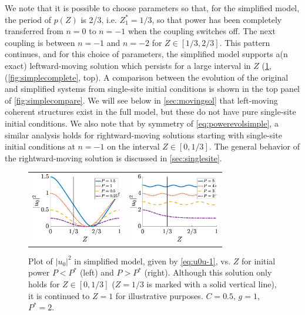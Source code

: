 \documentclass[reprint, amsmath,amssymb,aps,pre]{revtex4-2}
\begin{document}
We note that it is possible to choose parameters so that, for the simplified model, the period of $p(Z)$ is 2/3, i.e. $Z_1^* = 1/3$, so that power has been completely transferred from $n=0$ to $n=-1$ when the coupling switches off. The next coupling is between $n=-1$ and $n=-2$ for $Z \in [1/3,2/3]$. This pattern continues, and for this choice of parameters, the simplified model supports 
a(n exact) leftward-moving solution which persists for a large interval in $Z$ (\cref{fig:simplemodel1}, 
(\cref{fig:simplecomplete}, top). %
A comparison between the evolution of the original and simplified systems from single-site initial conditions is shown in the top panel of \cref{fig:simplecompare}. We will see below in \cref{sec:movingsol} that left-moving coherent structures exist in the full model, but these do not have pure single-site initial conditions. We also note that by symmetry of \cref{eq:powerevolsimple}, a similar analysis holds for rightward-moving solutions starting with single-site initial conditions at $n=-1$ on the interval $Z \in [0,1/3]$. The general behavior of the rightward-moving solution is discussed in \cref{sec:singlesite}.

\begin{figure}
    \centering
    \begin{tabular}{cc}
    \includegraphics[width=4cm]{plotCN.eps} &
    \includegraphics[width=4cm]{plotDN.eps}
    \end{tabular}
    \caption{Plot of $|u_0|^2$ in simplified model, given by \cref{eq:u0u-1}, vs. $Z$ for initial power $P<P^*$ (left) and $P>P^*$ (right). Although this solution only holds for $Z \in [0, 1/3]$ ($Z=1/3$ is marked with a solid vertical line), it is continued to $Z=1$ for illustrative purposes. $C=0.5$, $g=1$, $P^* = 2$.}
    \label{fig:simplemodel1}
\end{figure}
\end{document}
